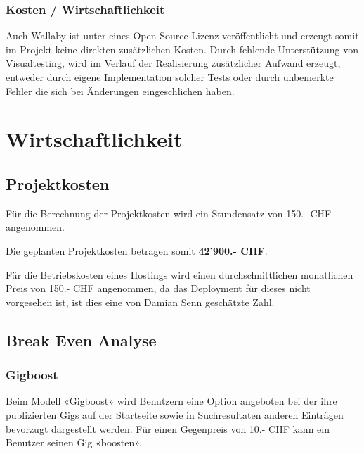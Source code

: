 \subsubsection{Kosten / Wirtschaftlichkeit}

Auch Wallaby ist unter eines Open Source Lizenz veröffentlicht und erzeugt
somit im Projekt keine direkten zusätzlichen Kosten. Durch fehlende
Unterstützung von Visualtesting, wird im Verlauf der Realisierung zusätzlicher
Aufwand erzeugt, entweder durch eigene Implementation solcher Tests oder durch
unbemerkte Fehler die sich bei Änderungen eingeschlichen haben.

\clearpage
\section{Wirtschaftlichkeit}\label{wirtschaftlichkeit}

\subsection{Projektkosten}

Für die Berechnung der Projektkosten wird ein Stundensatz von 150.- CHF angenommen.



\noindent
Die geplanten Projektkosten betragen somit \textbf{42'900.- CHF}.



Für die Betriebskosten eines Hostings wird einen durchschnittlichen monatlichen
Preis von 150.- CHF angenommen, da das Deployment für dieses nicht vorgesehen
ist, ist dies eine von Damian Senn geschätzte Zahl.

\clearpage
\subsection{Break Even Analyse}\label{break-even-analyse}

\subsubsection{Gigboost}

Beim Modell «Gigboost» wird Benutzern eine Option angeboten bei der ihre
publizierten Gigs auf der Startseite sowie in Suchresultaten anderen Einträgen
bevorzugt dargestellt werden. Für einen Gegenpreis von 10.- CHF kann ein Benutzer
seinen Gig «boosten».

